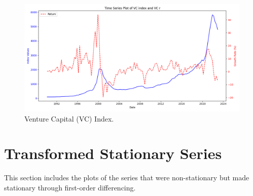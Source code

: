 \documentclass[12pt]{article}
\begin{document}
\begin{figure}[H]
    \centering
    \includegraphics[width=1\linewidth]{plot_VC_index.png}
    \caption{Venture Capital (VC) Index.}
    \label{fig:vc_index}
\end{figure}


\section{Transformed Stationary Series}

This section includes the plots of the series that were non-stationary but made stationary through first-order differencing.
\end{document}
